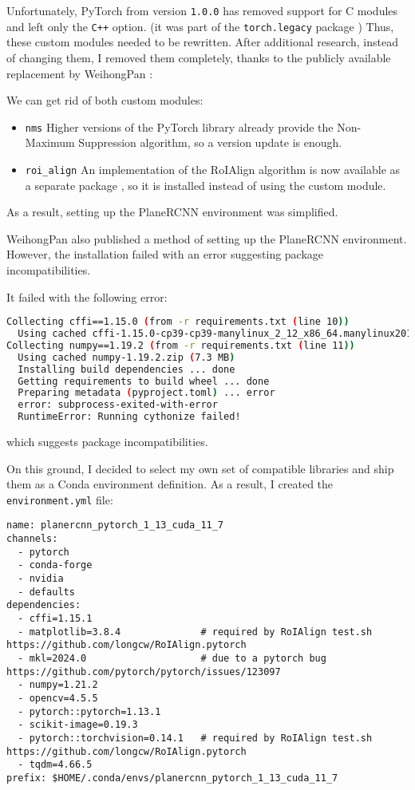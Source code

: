 Unfortunately, PyTorch from version \texttt{1.0.0} has removed support for C modules
and left only the \texttt{C++} \cite{cpp-language} option.
(it was part of the \texttt{torch.legacy} package \cite{pytorch-release-1.0.0})
Thus, these custom modules needed to be rewritten.
After additional research, instead of changing them, I removed them completely,
thanks to the publicly available replacement by WeihongPan \cite{planercnn-repository-weihong-pan-fork}:

We can get rid of both custom modules:
\begin{itemize}
\item \texttt{nms}
Higher versions of the PyTorch library already provide the Non-Maximum Suppression algorithm,
so a version update is enough.
\item \texttt{roi\_align}
An implementation of the RoIAlign algorithm is now available as a separate package \cite{roialign-package},
so it is installed instead of using the custom module.
\end{itemize}
As a result, setting up the PlaneRCNN environment was simplified.

\par

WeihongPan also published a method of setting up the PlaneRCNN environment.
However, the installation failed with an error suggesting package incompatibilities.

It failed with the following error:
\begin{lstlisting}[language=bash]
Collecting cffi==1.15.0 (from -r requirements.txt (line 10))
  Using cached cffi-1.15.0-cp39-cp39-manylinux_2_12_x86_64.manylinux2010_x86_64.whl.metadata (1.2 kB)
Collecting numpy==1.19.2 (from -r requirements.txt (line 11))
  Using cached numpy-1.19.2.zip (7.3 MB)
  Installing build dependencies ... done
  Getting requirements to build wheel ... done
  Preparing metadata (pyproject.toml) ... error
  error: subprocess-exited-with-error
  RuntimeError: Running cythonize failed!
\end{lstlisting}
which suggests package incompatibilities.

\par

On this ground, I decided to select my own set of compatible libraries
and ship them as a Conda \cite{conda-documentation} environment definition.
As a result, I created the \texttt{environment.yml} file:
\begin{lstlisting}[style=yaml]
name: planercnn_pytorch_1_13_cuda_11_7
channels:
  - pytorch
  - conda-forge
  - nvidia
  - defaults
dependencies:
  - cffi=1.15.1
  - matplotlib=3.8.4              # required by RoIAlign test.sh https://github.com/longcw/RoIAlign.pytorch
  - mkl=2024.0                    # due to a pytorch bug https://github.com/pytorch/pytorch/issues/123097
  - numpy=1.21.2
  - opencv=4.5.5
  - pytorch::pytorch=1.13.1
  - scikit-image=0.19.3
  - pytorch::torchvision=0.14.1   # required by RoIAlign test.sh https://github.com/longcw/RoIAlign.pytorch
  - tqdm=4.66.5
prefix: $HOME/.conda/envs/planercnn_pytorch_1_13_cuda_11_7
\end{lstlisting}

